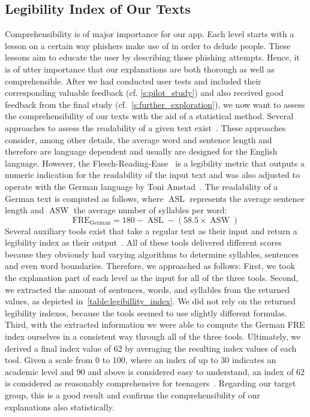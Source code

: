 \subsection{Legibility Index of Our Texts}
\label{s:legibility_index}
Comprehensibility is of major importance for our app. Each level starts with a lesson on a certain way phishers make use of in order to delude people. These lessons aim to educate the user by describing those phishing attempts. Hence, it is of utter importance that our explanations are both thorough as well as comprehensible. After we had conducted user tests and included their corresponding valuable feedback (cf. \autoref{s:pilot_study}) and also received good feedback from the final study (cf.~\autoref{s:further_exploration}), we now want to assess the comprehensibility of our texts with the aid of a statistical method. Several approaches to assess the readability of a given text exist~\cite{Gun,citeulike:7369187}. These approaches consider, among other details, the average word and sentence length and therefore are language dependent and usually are designed for the English language. However, the Flesch-Reading-Ease~\cite{citeulike:7369187} is a legibility metric that outputs a numeric indication for the readability of the input text and was also adjusted to operate with the German language by Toni Amstad~\cite{amstad1978verstandlich}. The readability of a German text is computed as follows, where $\operatorname{ASL}$ represents the average sentence length and $\operatorname{ASW}$ the average number of syllables per word:
$$\operatorname{FRE_{German}} = 180-\operatorname{ASL}-(58.5\times\operatorname{ASW})$$
Several auxiliary tools exist that take a regular text as their input and return a legibility index as their output~\cite{leichtlesbar, stilversprechend,fleschindexde}. All of these tools delivered different scores because they obviously had varying algorithms to determine syllables, sentences and even word boundaries.
Therefore, we approached as follows: First, we took the explanation part of each level as the input for all of the three tools. Second, we extracted the amount of sentences, words, and syllables from the returned values, as depicted in~\autoref{table:legibillity_index}. We did not rely on the returned legibility indexes, because the tools seemed to use slightly different formulas. Third, with the extracted information we were able to compute the German FRE index ourselves in a consistent way through all of the three tools. Ultimately, we derived a final index value of 62 by averaging the resulting index values of each tool. Given a scale from 0 to 100, where an index of up to 30 indicates an academic level and 90 and above is considered easy to understand, an index of 62 is considered as reasonably comprehensive for teenagers~\cite{amstad1978verstandlich}. Regarding our target group, this is a good result and confirms the comprehensibility of our explanations also statistically.

